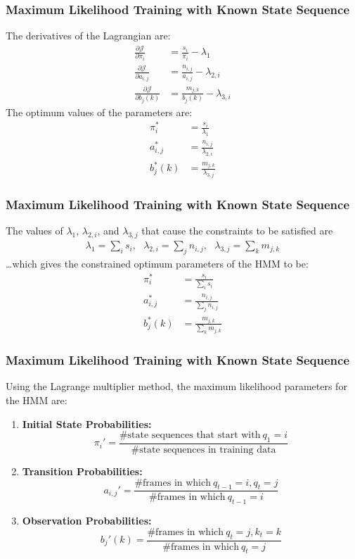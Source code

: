 \documentclass{beamer}
\begin{document}
\begin{frame}
  \frametitle{Maximum Likelihood Training with Known State Sequence}

  The derivatives of the Lagrangian are:
  \begin{align*}
    \frac{\partial\mathcal J}{\partial \pi_i} &= \frac{s_i}{\pi_i}-\lambda_1\\
    \frac{\partial\mathcal J}{\partial a_{i,j}} &= \frac{n_{i,j}}{a_{i,j}}-\lambda_{2,i}\\
    \frac{\partial\mathcal J}{\partial b_j(k)} &= \frac{m_{j,k}}{b_{j}(k)}-\lambda_{3,i}
  \end{align*}
  The optimum values of the parameters are:
  \begin{align*}
    \pi_i^* &= \frac{s_i}{\lambda_1}\\
    a_{i,j}^* &= \frac{n_{i,j}}{\lambda_{2,i}}\\
    b_j^*(k) &= \frac{m_{j,k}}{\lambda_{3,j}}
  \end{align*}
\end{frame}

\begin{frame}
  \frametitle{Maximum Likelihood Training with Known State Sequence}

  The values of $\lambda_1$, $\lambda_{2,i}$, and $\lambda_{3,j}$ that
  cause the constraints to be satisfied are
  \begin{align*}
    \lambda_1 = \sum_i s_i,~~~
    \lambda_{2,i} = \sum_j n_{i,j},~~~
    \lambda_{3,j} = \sum_k m_{j,k}
  \end{align*}
  \ldots which gives the constrained optimum parameters of the HMM to be:
  \begin{align*}
    \pi_i^* &= \frac{s_i}{\sum_i s_i}\\
    a_{i,j}^* &= \frac{n_{i,j}}{\sum_j n_{i,j}}\\
    b_j^*(k) &= \frac{m_{j,k}}{\sum_k m_{j,k}}
  \end{align*}
\end{frame}

\begin{frame}
  \frametitle{Maximum Likelihood Training with Known State Sequence}

  Using the Lagrange multiplier method, the maximum likelihood
  parameters for the HMM are:
  \begin{enumerate}
  \item {\bf Initial State Probabilities:}
    \[
    \pi_i'=\frac{\mbox{\# state sequences that start with}~q_1=i}{\mbox{\# state sequences in training data}}
    \]
  \item {\bf Transition Probabilities:}
    \[
    a_{i,j}'=\frac{\mbox{\# frames in which}~q_{t-1}=i,q_t=j}{\mbox{\# frames in which}~q_{t-1}=i}
    \]
  \item {\bf Observation Probabilities:} 
    \[
    b_j'(k)=\frac{\mbox{\# frames in which}~q_t=j,k_t=k}{\mbox{\# frames in which}~q_{t}=j}
    \]
  \end{enumerate}
\end{frame}
\end{document}

